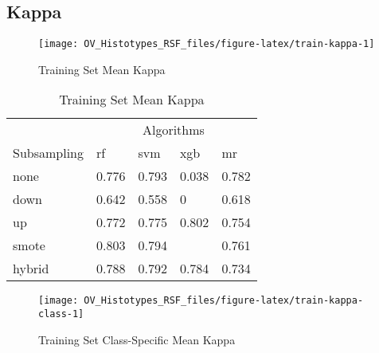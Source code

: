 \documentclass[
]{report}
\begin{document}
\subsection{Kappa}\label{kappa-1}

\begin{figure}[H]

{\centering \texttt{[image: OV\_Histotypes\_RSF\_files/figure-latex/train-kappa-1]} 

}

\caption{Training Set Mean Kappa}\label{fig:train-kappa}
\end{figure}

\begin{table}

\caption{\label{tab:train-kappa-table}Training Set Mean Kappa}
\centering
\begin{tabular}[t]{l|l|l|l|l}
\hline
\multicolumn{1}{c|}{ } & \multicolumn{4}{c}{Algorithms} \\
\cline{2-5}
Subsampling & rf & svm & xgb & mr\\
\hline
none & 0.776 & 0.793 & 0.038 & 0.782\\
\hline
down & 0.642 & 0.558 & 0 & 0.618\\
\hline
up & 0.772 & 0.775 & 0.802 & 0.754\\
\hline
smote & 0.803 & 0.794 & \cellcolor[HTML]{90ee90}{0.808} & 0.761\\
\hline
hybrid & 0.788 & 0.792 & 0.784 & 0.734\\
\hline
\end{tabular}
\end{table}

\begin{figure}[H]

{\centering \texttt{[image: OV\_Histotypes\_RSF\_files/figure-latex/train-kappa-class-1]} 

}

\caption{Training Set Class-Specific Mean Kappa}\label{fig:train-kappa-class}
\end{figure}
\end{document}
